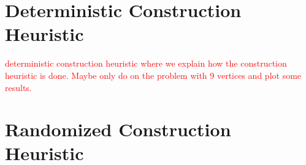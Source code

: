 \section{Deterministic Construction Heuristic}

\textcolor{red}{
deterministic construction heuristic where we explain how the construction heuristic is done.
Maybe only do on the problem with 9 vertices and plot some results.}

\pagebreak

\section{Randomized Construction Heuristic}